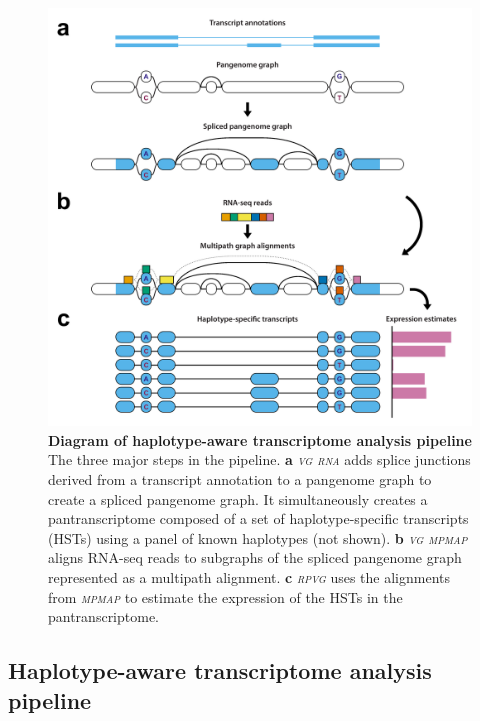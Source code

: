 \documentclass[11pt]{ucthesis}
\newcommand{\tool}[1]{\emph{\textsc{#1}}}
\begin{document}
\begin{figure}[h!]
\ssp
\begin{center}
\includegraphics[width=.75\textwidth]{mpmapfigures/figure1.pdf}
\caption{\textbf{Diagram of haplotype-aware transcriptome analysis pipeline} \\
The three major steps in the pipeline. \textbf{a} \tool{vg rna} adds splice junctions derived from a transcript annotation to a pangenome graph to create a spliced pangenome graph. It simultaneously creates a pantranscriptome composed of a set of haplotype-specific transcripts (HSTs) using a panel of known haplotypes (not shown). \textbf{b} \tool{vg mpmap} aligns RNA-seq reads to subgraphs of the spliced pangenome graph represented as a multipath alignment. \textbf{c} \tool{rpvg} uses the alignments from \tool{mpmap} to estimate the expression of the HSTs in the pantranscriptome.
} \label{fig:overview}
\end{center}
\end{figure}

\subsection{Haplotype-aware transcriptome analysis pipeline}
\end{document}
